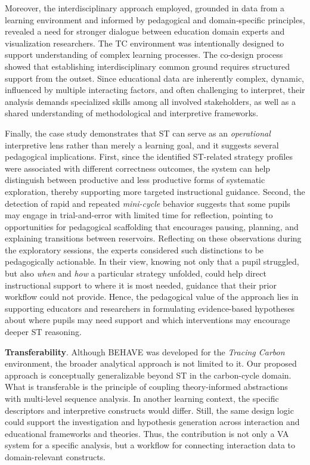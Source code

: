 \documentclass[letterpaper,journal]{IEEEtran}
\begin{document}
Moreover, the interdisciplinary approach employed, grounded in data from a learning environment and informed by pedagogical and domain‑specific principles, revealed a need for stronger dialogue between education domain experts and visualization researchers.
The TC environment was intentionally designed to support understanding of complex learning processes.
The co-design process showed that establishing interdisciplinary common ground requires structured support from the outset.
Since educational data are inherently complex, dynamic, influenced by multiple interacting factors, and often challenging to interpret, their analysis demands specialized skills among all involved stakeholders, as well as a shared understanding of methodological and interpretive frameworks.

Finally, the case study demonstrates that ST can serve as an \textit{operational} interpretive lens rather than merely a learning goal, and it suggests several pedagogical implications.
First, since the identified ST-related strategy profiles were associated with different correctness outcomes, the system can help distinguish between productive and less productive forms of systematic exploration, thereby supporting more targeted instructional guidance.
Second, the detection of rapid and repeated \textit{mini-cycle} behavior suggests that some pupils may engage in trial-and-error with limited time for reflection, pointing to opportunities for pedagogical scaffolding that encourages pausing, planning, and explaining transitions between reservoirs. 
Reflecting on these observations during the exploratory sessions, the experts considered such distinctions to be pedagogically actionable. In their view, knowing not only that a pupil struggled, but also \textit{when} and \textit{how} a particular strategy unfolded, could help direct instructional support to where it is most needed, guidance that their prior %
workflow could not provide.
Hence, the pedagogical value of the approach lies in supporting educators and researchers in formulating evidence-based hypotheses about where pupils may need support and which interventions may encourage deeper ST reasoning. 

\noindent
\textbf{Transferability}.
Although \textsc{BEHAVE} was developed for the \textit{Tracing Carbon} environment, the broader analytical approach is not limited to it. 
Our proposed approach is conceptually generalizable beyond ST in the carbon-cycle domain. 
What is transferable is the principle of coupling theory-informed abstractions with multi-level sequence analysis.
In another learning context, the specific descriptors and interpretive constructs would differ.
Still, the same design logic could support the investigation and hypothesis generation across interaction and educational frameworks and theories. 
Thus, the contribution is not only a VA system for a specific analysis, but a workflow for connecting interaction data to domain-relevant constructs.
\end{document}
